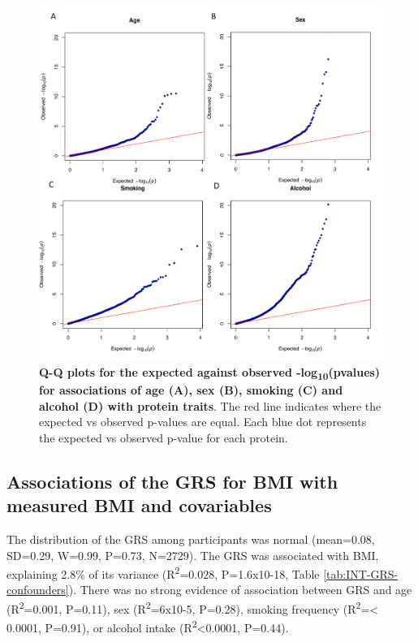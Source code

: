 \documentclass[11pt,twoside]{bristolthesis}
\begin{document}
\begin{figure}

{\centering \includegraphics[width=0.95\linewidth]{figure/BMI_protein_INTERVAL/QQ_confounder_proteins} 

}

\caption[Q-Q plots of the expected against observed -log\textsubscript{10}(pvalues) for the associations between covariables and protein traits]{\textbf{Q-Q plots for the expected against observed -log\textsubscript{10}(pvalues) for associations of age (A), sex (B), smoking (C) and alcohol (D) with protein traits}. The red line indicates where the expected vs observed p-values are equal. Each blue dot represents the expected vs observed p-value for each protein.}\label{fig:QQ-confounder-proteins}
\end{figure}
\hypertarget{associations-of-the-grs-for-bmi-with-measured-bmi-and-covariables}{%
\subsection{Associations of the GRS for BMI with measured BMI and covariables}\label{associations-of-the-grs-for-bmi-with-measured-bmi-and-covariables}}

The distribution of the GRS among participants was normal (mean=0.08, SD=0.29, W=0.99, P=0.73, N=2729). The GRS was associated with BMI, explaining 2.8\% of its variance (R\textsuperscript{2}=0.028, P=1.6x10-18, Table \ref{tab:INT-GRS-confounders}). There was no strong evidence of association between GRS and age (R\textsuperscript{2}=0.001, P=0.11), sex (R\textsuperscript{2}=6x10-5, P=0.28), smoking frequency (R\textsuperscript{2}=\textless{} 0.0001, P=0.91), or alcohol intake (R\textsuperscript{2}\textless0.0001, P=0.44).
\end{document}
